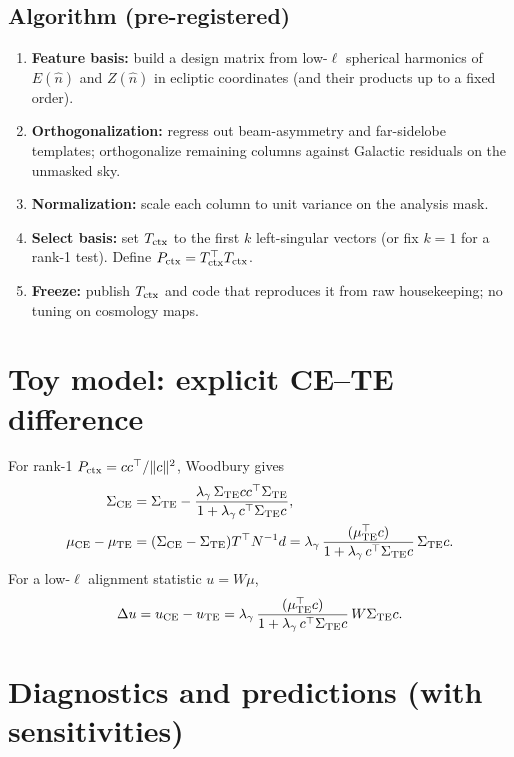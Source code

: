 \documentclass[11pt]{article}
\begin{document}
\subsection{Algorithm (pre-registered)}
\begin{enumerate}[label=\arabic*.,leftmargin=*]
\item \textbf{Feature basis:} build a design matrix from low-$\ell$ spherical harmonics of $E(\hat n)$ and $Z(\hat n)$ in ecliptic coordinates (and their products up to a fixed order).
\item \textbf{Orthogonalization:} regress out beam-asymmetry and far-sidelobe templates; orthogonalize remaining columns against Galactic residuals on the unmasked sky.
\item \textbf{Normalization:} scale each column to unit variance on the analysis mask.
\item \textbf{Select basis:} set $T_{\rm ctx}$ to the first $k$ left-singular vectors (or fix $k=1$ for a rank-1 test). Define $P_{\rm ctx}=T_{\rm ctx}^\top T_{\rm ctx}$.
\item \textbf{Freeze:} publish $T_{\rm ctx}$ and code that reproduces it from raw housekeeping; no tuning on cosmology maps.
\end{enumerate}

\section{Toy model: explicit CE--TE difference}
\label{sec:toy}

For rank-1 $P_{\rm ctx}=cc^\top/\|c\|^2$, Woodbury gives
\begin{align}
\Sigma_{\rm CE}&=\Sigma_{\rm TE}-\frac{\lambda_\gamma\,\Sigma_{\rm TE} c c^\top \Sigma_{\rm TE}}{1+\lambda_\gamma\, c^\top \Sigma_{\rm TE} c},\\
\mu_{\rm CE}-\mu_{\rm TE}&=(\Sigma_{\rm CE}-\Sigma_{\rm TE})T^\top N^{-1}d
= \lambda_\gamma\,\frac{(\mu_{\rm TE}^\top c)}{1+\lambda_\gamma\, c^\top \Sigma_{\rm TE} c}\,\Sigma_{\rm TE}c.
\end{align}
For a low-$\ell$ alignment statistic $u=W\mu$,
\begin{equation}
\Delta u = u_{\rm CE}-u_{\rm TE}
= \lambda_\gamma\,\frac{(\mu_{\rm TE}^\top c)}{1+\lambda_\gamma\, c^\top \Sigma_{\rm TE} c}\, W\Sigma_{\rm TE}c.
\end{equation}

\section{Diagnostics and predictions (with sensitivities)}
\label{sec:diagnostics}
\end{document}

